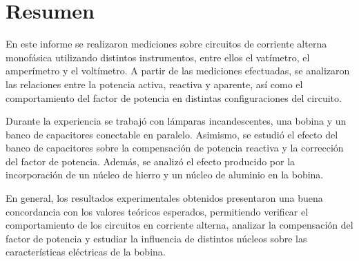 \section{Resumen}

En este informe se realizaron mediciones sobre circuitos de corriente alterna monofásica utilizando distintos instrumentos, entre ellos el vatímetro, el amperímetro y el voltímetro. A partir de las mediciones efectuadas, se analizaron las relaciones entre la potencia activa, reactiva y aparente, así como el comportamiento del factor de potencia en distintas configuraciones del circuito.

Durante la experiencia se trabajó con lámparas incandescentes, una bobina y un banco de capacitores conectable en paralelo. Asimismo, se estudió el efecto del banco de capacitores sobre la compensación de potencia reactiva y la corrección del factor de potencia. Además, se analizó el efecto producido por la incorporación de un núcleo de hierro y un núcleo de aluminio en la bobina.

En general, los resultados experimentales obtenidos presentaron una buena concordancia con los valores teóricos esperados, permitiendo verificar el comportamiento de los circuitos en corriente alterna, analizar la compensación del factor de potencia y estudiar la influencia de distintos núcleos sobre las características eléctricas de la bobina.

\newpage
